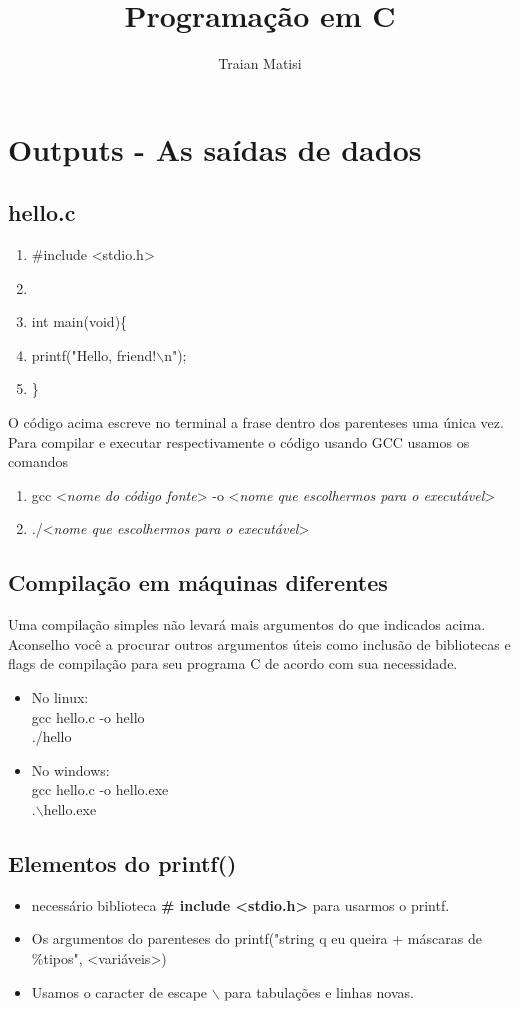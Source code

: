 \documentclass[12pt,a4paper]{article} %
\author{Traian Matisi}
\title{Programação em C}
\begin{document}
\maketitle

\section{Outputs - As saídas de dados}

\subsection{hello.c}
\begin{enumerate}
\item \#include <stdio.h>
\item 
\item int main(void)\{
\item \tabto{1.1cm} printf("Hello, friend!$\backslash$n");
\item \}
\end{enumerate}
\tabto{2cm}O código acima escreve no terminal a frase dentro dos parenteses uma única vez.
Para compilar e executar respectivamente o código usando GCC usamos os comandos
\begin{enumerate}
\item gcc <\emph{nome do código fonte}> -o <\emph{nome que escolhermos para o executável}>
\item ./<\emph{nome que escolhermos para o executável}>
\end{enumerate}

\subsection{Compilação em máquinas diferentes}
Uma compilação simples não levará mais argumentos do que indicados acima. Aconselho você a procurar outros argumentos úteis como inclusão de bibliotecas e flags de compilação para seu programa C de acordo com sua necessidade.
\begin{itemize}
\item No linux:\\gcc hello.c -o hello\\./hello
\item No windows:\\gcc hello.c -o hello.exe\\.$\backslash$hello.exe
\end{itemize}

\subsection{Elementos do printf()}
\begin{itemize}
\item necessário biblioteca \textbf{\# include <stdio.h>} para usarmos o printf.
\item Os argumentos do parenteses do printf("string q eu queira + máscaras de \%tipos", <variáveis>)
\item Usamos o caracter de escape $\backslash$ para tabulações e linhas novas.
\end{itemize}
\end{document}
